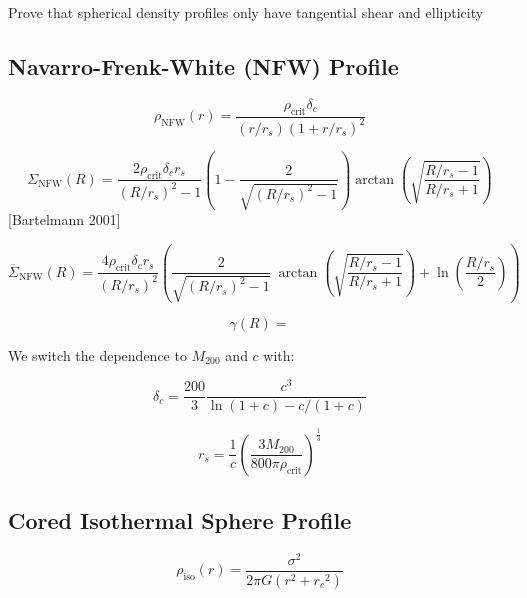 \documentclass[]{article}
\begin{document}
Prove that spherical density profiles only have tangential shear and ellipticity

\newpage

\subsection{Navarro-Frenk-White (NFW) Profile}

\begin{equation}
    \rho_\mathrm{NFW}(r) = \frac{\rho_\mathrm{crit} \delta_c}{(r/r_s)\left(1 + r/r_s\right)^2}
\end{equation}

\begin{equation}
    \Sigma_\mathrm{NFW}(R) = \frac{2 \rho_\mathrm{crit} \delta_c r_s}{(R/r_s)^2 - 1} \left(1 - \frac{2}{\sqrt{(R/r_s)^2 - 1}} \right) \arctan\left(\sqrt{\frac{R/r_s - 1}{R/r_s + 1}} \right)
\end{equation}
[Bartelmann 2001]

\begin{equation}
    \overline{\Sigma}_\mathrm{NFW}(R) = \frac{4 \rho_\mathrm{crit} \delta_c r_s}{(R/r_s)^2} \left(
        \frac{2}{\sqrt{(R/r_s)^2 - 1}} ~\arctan\left(\sqrt{\frac{R/r_s - 1}{R/r_s + 1}} \right) + \ln{\left(\frac{R/r_s}{2}\right)}
    \right)
\end{equation}

\begin{equation}
    \gamma(R) =
\end{equation}

We switch the dependence to $M_{200}$ and $c$ with:

\begin{equation}
    \delta_c = \frac{200}{3} \frac{c^3}{\ln(1 + c) - c/(1 + c)}
\end{equation}

\begin{equation}
    r_s = \frac{1}{c} \left(\frac{3M_{200}}{800\pi \rho_\mathrm{crit}}\right)^\frac{1}{3}
\end{equation}

\subsection{Cored Isothermal Sphere Profile}

\begin{equation}
    \rho_\mathrm{iso}(r) = \frac{\sigma^2}{2\pi G (r^2 + {r_c}^2)}
\end{equation}
\end{document}
